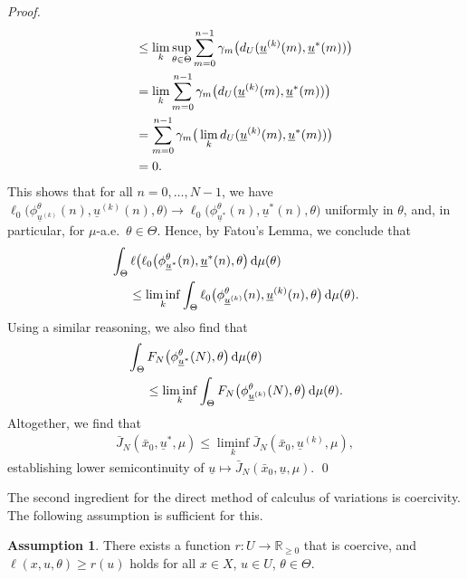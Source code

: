\documentclass[letterpaper, 10 pt, conference]{IEEEconf}  %
\newcommand{\Rnn}{\mathbb{R}_{\geq 0}} %
\newcommand{\diff}{\, \mathrm{d}} %
\newcommand{\s}{\phi} %
\newcommand{\es}{\bar{x}} %
\newcommand{\is}[1]{{\underline{#1}}} %
\theoremstyle{theorem}
\theoremstyle{definition}
\newtheorem{assumption}{Assumption}
\theoremstyle{remark}
\begin{document}
\begin{proof}
\begin{align*}
    & \hspace{0.5cm} \leq \lim_{k} \sup_{\theta\in\Theta} 
     \sum_{m=0}^{n-1} \gamma_m \big(d_U(\is{u}^{(k)}(m),\is{u}^\ast(m)) \big) \\
    & \hspace{0.5cm} = \lim_{k} \sum_{m=0}^{n-1} \gamma_m \big(d_U(\is{u}^{(k)}(m),\is{u}^\ast(m)) \big) \\
    & \hspace{0.5cm} = \sum_{m=0}^{n-1} \gamma_m \big( \lim_{k}  d_U (\is{u}^{(k)}(m),\is{u}^\ast(m)) \big) \\
    & \hspace{0.5cm} = 0.
\end{align*}
This shows that for all $n=0,\ldots,N-1$, we have $\ell_0 \big( \s_{\is{u}^{(k)}}^\theta(n), \is{u}^{(k)}(n), \theta \big)  \rightarrow  \ell_0 \big( \s_{\is{u}^\ast}^\theta(n), \is{u}^\ast(n), \theta \big)$ uniformly in $\theta$, and, in particular, for $\mu$-a.e.~$\theta \in \Theta$.
Hence, by Fatou's Lemma, we conclude that
\begin{align*}
    & \int_\Theta \ell \big( \ell_0 \big( \s_{\is{u}^\ast}^\theta(n), \is{u}^\ast(n), \theta \big) \diff \mu(\theta) \\
    & \hspace{0.5cm} \leq \liminf_{k} \int_\Theta \ell_0 \big( \s_{\is{u}^{(k)}}^\theta(n), \is{u}^{(k)}(n), \theta \big) \diff \mu(\theta).
\end{align*}
Using a similar reasoning, we also find that
\begin{align*}
      & \int_\Theta F_N \big( \s_{\is{u}^\ast}^\theta(N), \theta \big) \diff \mu(\theta) \\
      & \hspace{0.5cm} \leq \liminf_{k}  \int_\Theta F_N \big( \s_{\is{u}^{(k)}}^\theta(N), \theta \big) \diff \mu(\theta).
\end{align*}
Altogether, we find that
\begin{align*}
    \bar J_N(\es_0, \is{u}^\ast, \mu) \leq \liminf_{k} \bar J_N(\es_0,\is{u}^{(k)},\mu),
\end{align*}
establishing lower semicontinuity of $\is{u} \mapsto \bar J_N(\es_0,\is{u},\mu)$. \qed
\end{proof}
The second ingredient for the direct method of calculus of variations is coercivity.
The following assumption is sufficient for this.
\begin{assumption} \label{assump:dteoc:coercivityOfStageCost}
There exists a function $r\colon U \rightarrow \Rnn$ that is coercive, and $\ell(x,u,\theta)\geq r(u)$ holds for all $x\in X$, $u \in U$, $\theta \in \Theta$.
\end{assumption}
\end{document}
